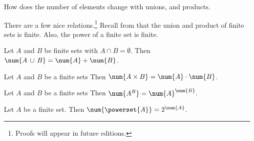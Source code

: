

How does the number of elements change with unions, and products.


There are a few nice relations.\footnote{Proofs will appear in future editions.}
Recall from  that the union and product of finite sets is finite.
Also, the power of a finite set is finite.

\begin{proposition}
  Let $A$ and $B$ be finite sets with $A \cap B = \emptyset$.
  Then $\num{A \union B} = \num{A} + \num{B}$.
\end{proposition}

\begin{proposition}
	Let $A$ and $B$ be a finite sets
	Then $\num{A \times B} = \num{A} \cdot \num{B}$.
\end{proposition}

\begin{proposition}
	Let $A$ and $B$ be a finite sets
	Then $\num{A^B} = \num{A}^{\num{B}}$.
\end{proposition}

\begin{proposition}
	Let $A$ be a finite set.
	Then $\num{\powerset{A}} = 2^{\num{A}}$.
\end{proposition}

\blankpage


